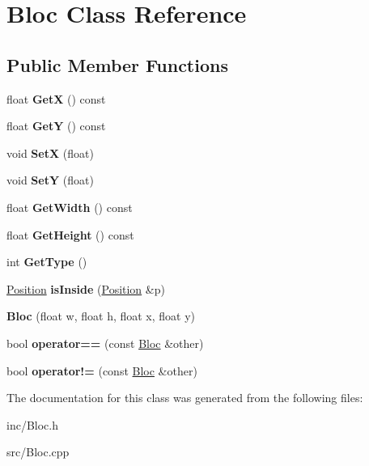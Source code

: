 \hypertarget{class_bloc}{}\section{Bloc Class Reference}
\label{class_bloc}
\subsection*{Public Member Functions}
\begin{DoxyCompactItemize}
\item 
\mbox{\label{class_bloc_a6ae380db2c10d50d098728b34b43df66}} 
float {\bfseries GetX} () const
\item 
\mbox{\label{class_bloc_acbb64a0a7cb81da8874fe8ca5ec9c81f}} 
float {\bfseries GetY} () const
\item 
\mbox{\label{class_bloc_a392736db02e99f11d849ce2180f5abbc}} 
void {\bfseries SetX} (float)
\item 
\mbox{\label{class_bloc_a03ac18c8d9d0e384e6429017421bfe02}} 
void {\bfseries SetY} (float)
\item 
\mbox{\label{class_bloc_ac32976d930540a96580e51fe098718ec}} 
float {\bfseries Get\+Width} () const
\item 
\mbox{\label{class_bloc_a20ffee2055284a8fcf5354263564ae4f}} 
float {\bfseries Get\+Height} () const
\item 
\mbox{\label{class_bloc_af53214c8c6bf976f9f558d7f5aed4477}} 
int {\bfseries Get\+Type} ()
\item 
\mbox{\label{class_bloc_aeaaef9f2c4a6930baa4caa11ce86152b}} 
\hyperlink{class_position}{Position} {\bfseries is\+Inside} (\hyperlink{class_position}{Position} \&p)
\item 
\mbox{\label{class_bloc_af2f85c992ae404da3be3bea84fcf5b73}} 
{\bfseries Bloc} (float w, float h, float x, float y)
\item 
\mbox{\label{class_bloc_a71ced13d0f0459f1285bd189a14b1fa8}} 
bool {\bfseries operator==} (const \hyperlink{class_bloc}{Bloc} \&other)
\item 
\mbox{\label{class_bloc_ac537c7d7f4a05ee01e0cada58e7da785}} 
bool {\bfseries operator!=} (const \hyperlink{class_bloc}{Bloc} \&other)
\end{DoxyCompactItemize}


The documentation for this class was generated from the following files\+:\begin{DoxyCompactItemize}
\item 
inc/Bloc.\+h\item 
src/Bloc.\+cpp\end{DoxyCompactItemize}
